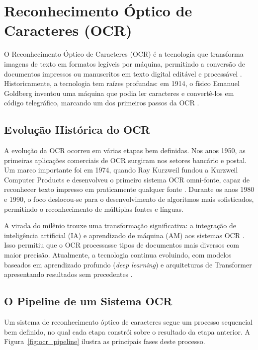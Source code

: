 \documentclass[
  12pt,
  oneside,
  a4paper,
  chapter=TITLE,
  section=TITLE,
  english,
  brazil
]{abntex2}
\begin{document}
\section{Reconhecimento Óptico de Caracteres (OCR)}

O Reconhecimento Óptico de Caracteres (OCR) é a tecnologia que transforma imagens de
texto em formatos legíveis por máquina, permitindo a conversão de documentos impressos
ou manuscritos em texto digital editável e processável \cite{OneAdvanced2022}.
Historicamente, a tecnologia tem raízes profundas: em 1914, o físico Emanuel Goldberg
inventou uma máquina que podia ler caracteres e convertê-los em código telegráfico,
marcando um dos primeiros passos da OCR \cite{Incode2025}.

\subsection{Evolução Histórica do OCR}

A evolução da OCR ocorreu em várias etapas bem definidas. Nos anos 1950, as primeiras
aplicações comerciais de OCR surgiram nos setores bancário e postal. Um marco importante
foi em 1974, quando Ray Kurzweil fundou a Kurzweil Computer Products e desenvolveu o
primeiro sistema OCR omni-fonte, capaz de reconhecer texto impresso em praticamente
qualquer fonte \cite{Incode2025}. Durante os anos 1980 e 1990, o foco deslocou-se para
o desenvolvimento de algoritmos mais sofisticados, permitindo o reconhecimento de
múltiplas fontes e línguas.

A virada do milênio trouxe uma transformação significativa: a integração de inteligência
artificial (IA) e aprendizado de máquina (AM) aos sistemas OCR \cite{Idenfo2024}. Isso
permitiu que o OCR processasse tipos de documentos mais diversos com maior precisão.
Atualmente, a tecnologia continua evoluindo, com modelos baseados em aprendizado profundo
(\textit{deep learning}) e arquiteturas de Transformer apresentando resultados sem
precedentes \cite{PictureText2025}.

\subsection{O Pipeline de um Sistema OCR}

Um sistema de reconhecimento óptico de caracteres segue um processo sequencial bem
definido, no qual cada etapa constrói sobre o resultado da etapa anterior. A
Figura~\ref{fig:ocr_pipeline} ilustra as principais fases deste processo.
\end{document}
